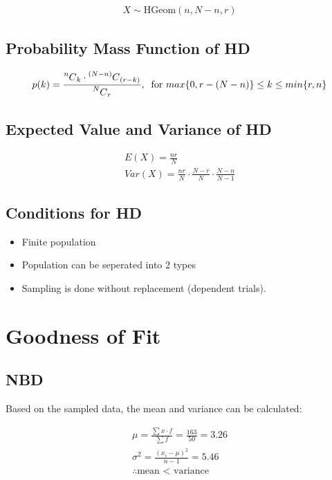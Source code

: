 \documentclass{article}
\newcommand\Mycomb[2][^n]{\prescript{#1\mkern-0.5mu}{}C_{#2}}
\begin{document}
\begin{gather*}
  X \sim \text{HGeom}(n, N-n, r)
\end{gather*}

\subsection{Probability Mass Function of HD}

\begin{gather*}
  p(k) =  \frac{\Mycomb[n]{k} \cdot \Mycomb[(N-n)]{(r-k)}}
  {\Mycomb[N]{r}}, \; \;
  \text{for } max\{ 0, r - (N - n) \} \leq k \leq min\{r, n\}
\end{gather*}

\subsection{Expected Value and Variance of HD}
\begin{gather*}
  E(X) = \frac{nr}{N} \\[5pt]
  Var(X) = \frac{nr}{N} \cdot \frac{N -r}{N} \cdot \frac{N-n}{N-1}
\end{gather*}

\subsection{Conditions for HD}
\begin{itemize}
  \item Finite population
  \item Population can be seperated into 2 types
  \item Sampling is done without replacement (dependent trials).
\end{itemize}

\section{Goodness of Fit}

\subsection{NBD}

Based on the sampled data, the mean and variance can be calculated:

\begin{gather*}
  \mu = \frac{\sum x \cdot f}{\sum f} = \frac{163}{50} = 3.26 \\[5pt]
  \sigma^2 = \frac{(x_i - \mu)^2}{n - 1} = 5.46 \\[5pt]
  \therefore \text{mean < variance}
\end{gather*}
\end{document}
